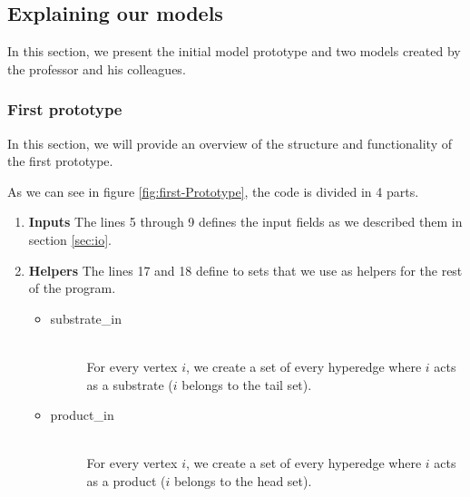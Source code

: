 \subsection{Explaining our models}
In this section, we present the initial model prototype and two models created by the professor and his colleagues.
\subsubsection{First prototype} \label{sec:first_prototype}
In this section, we will provide an overview of the structure and functionality of the first prototype.

As we can see in figure \ref{fig:first-Prototype}, the code is divided in 4 parts.

\begin{enumerate}
    \item \textbf{Inputs} The lines 5 through 9 defines the input fields as we described them in section \ref{sec:io}.
    \item \textbf{Helpers} The lines 17 and 18 define to sets that we use as helpers for the rest of the program.
    \begin{itemize}
        \item
        \begin{description}
            \item[substrate\_in] ~\\ For every vertex $i$, we create a set of every hyperedge where $i$ acts as a substrate ($i$ belongs to the tail set).
        \end{description}
        \item
        \begin{description}
            \item[product\_in] ~\\ For every vertex $i$, we create a set of every hyperedge where $i$ acts as a product ($i$ belongs to the head set).
        \end{description}
    \end{itemize}
    

\end{enumerate}
